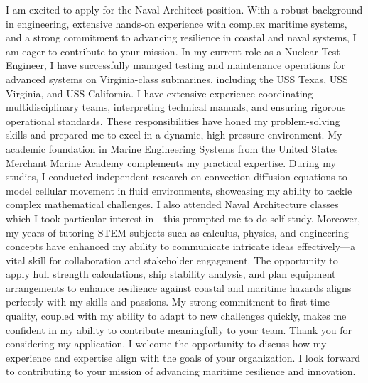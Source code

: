 
I am excited to apply for the Naval Architect position.
With a robust background in engineering, extensive hands-on experience with complex maritime systems, and a strong commitment to advancing resilience in coastal and naval systems, I am eager to contribute to your mission.
In my current role as a Nuclear Test Engineer, I have successfully managed testing and maintenance operations for advanced systems on Virginia-class submarines, including the USS Texas, USS Virginia, and USS California.
I have extensive experience coordinating multidisciplinary teams, interpreting technical manuals, and ensuring rigorous operational standards.
These responsibilities have honed my problem-solving skills and prepared me to excel in a dynamic, high-pressure environment.
My academic foundation in Marine Engineering Systems from the United States Merchant Marine Academy complements my practical expertise.
During my studies, I conducted independent research on convection-diffusion equations to model cellular movement in fluid environments, showcasing my ability to tackle complex mathematical challenges.
I also attended Naval Architecture classes which I took particular interest in - this prompted me to do self-study.
Moreover, my years of tutoring STEM subjects such as calculus, physics, and engineering concepts have enhanced my ability to communicate intricate ideas effectively—a vital skill for collaboration and stakeholder engagement.
The opportunity to apply hull strength calculations, ship stability analysis, and plan equipment arrangements to enhance resilience against coastal and maritime hazards aligns perfectly with my skills and passions.
My strong commitment to first-time quality, coupled with my ability to adapt to new challenges quickly, makes me confident in my ability to contribute meaningfully to your team.
Thank you for considering my application.
I welcome the opportunity to discuss how my experience and expertise align with the goals of your organization.
I look forward to contributing to your mission of advancing maritime resilience and innovation.

